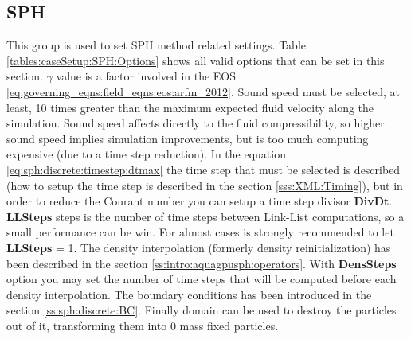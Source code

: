 \subsection{SPH}
\label{sss:XML:SPH}
%
This group is used to set SPH method related settings. Table
\ref{tables:caseSetup:SPH:Options} shows all valid options that
can be set in this section.\rc
%
$\gamma$ value is a factor involved in the EOS
\ref{eq:governing_eqns:field_eqns:eos:arfm_2012}.\rc
%
Sound speed must be selected, at least, 10 times greater than the
maximum expected fluid velocity along the simulation. Sound speed
affects directly to the fluid compressibility, so higher sound
speed implies simulation improvements, but is too much computing
expensive (due to a time step reduction).\rc
%
In the equation \ref{eq:sph:discrete:timestep:dtmax} the time step
that must be selected is described (how to setup the time step is
described in the section \ref{sss:XML:Timing}), but in order to
reduce the Courant number you can setup a time step divisor
\textbf{DivDt}.\rc
%
\textbf{LLSteps} steps is the number of time steps between Link-List
computations, so a small performance can be win. For almost cases is
strongly recommended to let \textbf{LLSteps} = 1.\rc
%
The density interpolation (formerly density reinitialization) has been
described in the section \ref{ss:intro:aquagpusph:operators}. With
\textbf{DensSteps} option you may set the number of time steps that
will be computed before each density interpolation.\rc
%
The boundary conditions has been introduced in the section
\ref{ss:sph:discrete:BC}.\rc
%
Finally domain can be used to destroy the particles out of it,
transforming them into 0 mass fixed particles.
%
